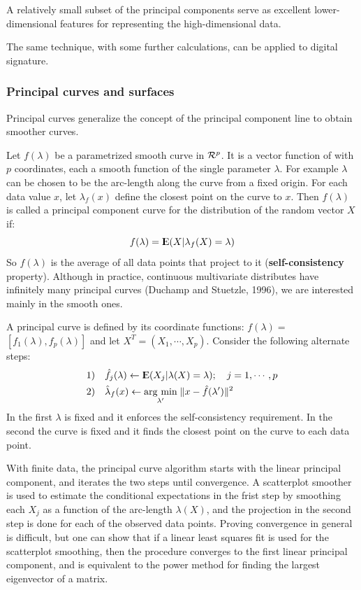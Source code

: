 A relatively small subset of the principal components serve as excellent lower-dimensional features for representing the high-dimensional data.

The same technique, with some further calculations, can be applied to digital signature.

\subsubsection{Principal curves and surfaces}
Principal curves generalize the concept of the principal component line to obtain smoother curves. 

Let $f(\lambda)$ be a parametrized smooth curve in $\CMcal{R}^p$. It is a vector function of with $p$ coordinates, each a smooth function of the single parameter $\lambda$. For example $\lambda$ can be chosen to be the arc-length along the curve from a fixed origin. For each data value $x$, let $\lambda_f(x)$ define the closest point on the curve to $x$. Then $f(\lambda)$ is called a principal component curve for the distribution of the random vector $X$ if:
\begin{equation}
f(\lambda) = \E\br{X|\lambda_f(X) = \lambda}
\end{equation}
So $f(\lambda)$ is the average of all data points that project to it (\textbf{self-consistency} property). Although in practice, continuous multivariate distributes have infinitely many principal curves (Duchamp and Stuetzle, 1996), we are interested mainly in the smooth ones.

A principal curve is defined by its coordinate functions: $f(\lambda) =$ $[ f_1(\lambda), f_p(\lambda)]$ and let $X^T = (X_1, \cdots, X_p)$. Consider the following alternate steps:
\begin{equation}
\begin{aligned}
&1) \quad \hat{f}_j(\lambda)\leftarrow \E \br{X_j|\lambda(X) = \lambda}; \quad j=1,\cdots, p\\
&2) \quad \hat{\lambda}_f(x) \leftarrow \argmin{\lambda'}{\|x -\hat{f}(\lambda')\|^2}
\end{aligned}
\end{equation}
In the first $\lambda$ is fixed and it enforces the self-consistency requirement. In the second the curve is fixed and it finds the closest point on the curve to each data point.

With finite data, the principal curve algorithm starts with the linear principal component, and iterates the two steps until convergence.
A scatterplot smoother is used to estimate the conditional expectations in the frist step by smoothing each $X_j$ as a function of the arc-length $\lambda(X)$, and the projection in the second step is done for each of the observed data points. Proving convergence in general is difficult, but one can show that if a linear least squares fit is used for the scatterplot smoothing, then the procedure converges to the first linear principal component, and is equivalent to the power method for finding the largest eigenvector of a matrix.

